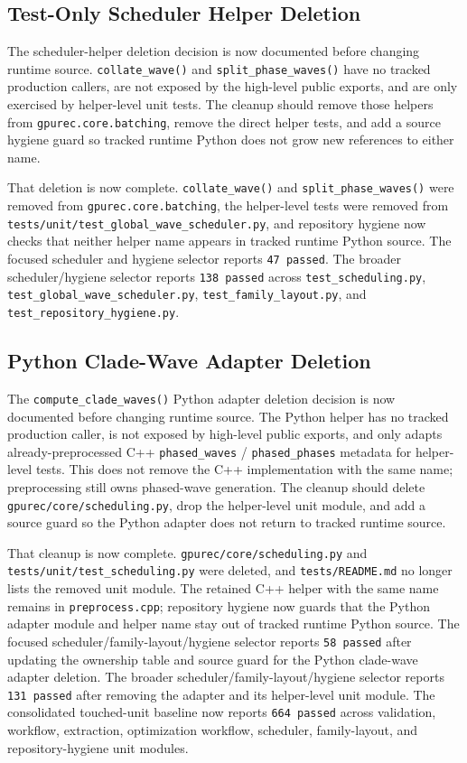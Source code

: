 \documentclass[11pt]{article}
\begin{document}
\subsection{Test-Only Scheduler Helper Deletion}

The scheduler-helper deletion decision is now documented before changing
runtime source.  \texttt{collate\_wave()} and \texttt{split\_phase\_waves()}
have no tracked production callers, are not exposed by the high-level public
exports, and are only exercised by helper-level unit tests.  The cleanup should
remove those helpers from \texttt{gpurec.core.batching}, remove the direct
helper tests, and add a source hygiene guard so tracked runtime Python does not
grow new references to either name.

That deletion is now complete.  \texttt{collate\_wave()} and
\texttt{split\_phase\_waves()} were removed from \texttt{gpurec.core.batching},
the helper-level tests were removed from
\texttt{tests/unit/test\_global\_wave\_scheduler.py}, and repository hygiene now
checks that neither helper name appears in tracked runtime Python source.  The
focused scheduler and hygiene selector reports \texttt{47 passed}.
The broader scheduler/hygiene selector reports \texttt{138 passed} across
\texttt{test\_scheduling.py}, \texttt{test\_global\_wave\_scheduler.py},
\texttt{test\_family\_layout.py}, and
\texttt{test\_repository\_hygiene.py}.

\subsection{Python Clade-Wave Adapter Deletion}

The \texttt{compute\_clade\_waves()} Python adapter deletion decision is now
documented before changing runtime source.  The Python helper has no tracked
production caller, is not exposed by high-level public exports, and only adapts
already-preprocessed C++ \texttt{phased\_waves} /
\texttt{phased\_phases} metadata for helper-level tests.  This does not remove
the C++ implementation with the same name; preprocessing still owns phased-wave
generation.  The cleanup should delete \texttt{gpurec/core/scheduling.py}, drop
the helper-level unit module, and add a source guard so the Python adapter does
not return to tracked runtime source.

That cleanup is now complete.  \texttt{gpurec/core/scheduling.py} and
\texttt{tests/unit/test\_scheduling.py} were deleted, and
\texttt{tests/README.md} no longer lists the removed unit module.  The retained
C++ helper with the same name remains in \texttt{preprocess.cpp}; repository
hygiene now guards that the Python adapter module and helper name stay out of
tracked runtime Python source.
The focused scheduler/family-layout/hygiene selector reports \texttt{58 passed}
after updating the ownership table and source guard for the Python clade-wave
adapter deletion.
The broader scheduler/family-layout/hygiene selector reports \texttt{131 passed}
after removing the adapter and its helper-level unit module.
The consolidated touched-unit baseline now reports \texttt{664 passed} across
validation, workflow, extraction, optimization workflow, scheduler,
family-layout, and repository-hygiene unit modules.
\end{document}
